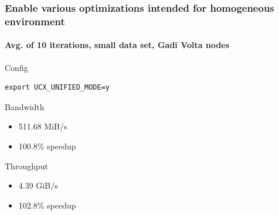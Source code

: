 \documentclass{beamer}
\begin{document}
\begin{frame}[fragile]
    \frametitle{Enable various optimizations intended for homogeneous environment}
    \framesubtitle{Avg. of 10 iterations, small data set, Gadi Volta nodes}
    
    \begin{exampleblock}{Config}
        \begin{lstlisting}
export UCX_UNIFIED_MODE=y
        \end{lstlisting}
    \end{exampleblock}
    
    \begin{block}{Bandwidth}
        \begin{itemize}
            \item 511.68 MiB/s
            \item 100.8\% speedup
        \end{itemize}
    \end{block}
    
    \begin{alertblock}{Throughput}
        \begin{itemize}
            \item 4.39 GiB/s
            \item 102.8\% speedup
        \end{itemize}
    \end{alertblock}
\end{frame}
\end{document}
